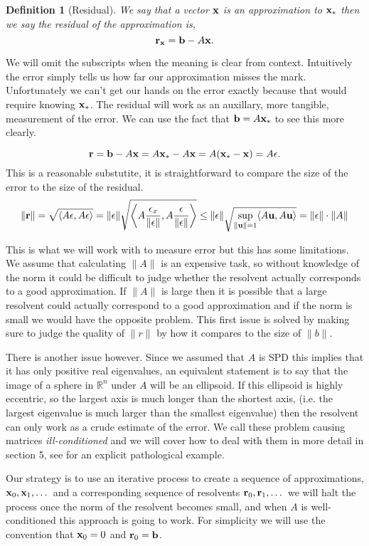 \documentclass{article}
\newcommand{\bx}{{\bf x}}
\newcommand{\bb}{{\bf b}}
\newcommand{\br}{{\bf r}}
\newcommand{\bu}{{\bf u}}
\newcommand{\R}{\mathbb{R}}
\newcommand{\beq}{\begin{equation}}
\newcommand{\eeq}{\end{equation}}
\newtheorem{defn}{Definition}[section]
\theoremstyle{remark}
\begin{document}
\begin{defn}[Residual] We say that a vector $\bx$ is an approximation to $\bx_*$ then we say the residual of the approximation is, 
\beq
\br_\bx = \bb - A\bx .
\eeq
\end{defn}

We will omit the subscripts when the meaning is clear from context. Intuitively the error simply tells us how far our approximation misses the mark. Unfortunately we can't get our hands on the error exactly because that would require knowing $\bx_*$. The residual will work as an auxillary, more tangible, measurement of the error. We can use the fact that $\bb = A\bx_*$ to see this more clearly. 

\beq
\br = \bb - A\bx = A\bx_* - A\bx = A(\bx_* - \bx) = A\epsilon.
\eeq
This is a reasonable substutite, it is straightforward to compare the size of the error to the size of the residual. 
\beq
\|\br \| = \sqrt{\langle A\epsilon , A\epsilon \rangle} = \|\epsilon\|\sqrt{ \left\langle A\frac{\epsilon_x}{\|\epsilon\|} , A\frac{\epsilon}{\|\epsilon\|} \right\rangle} \leq \|\epsilon\| \sqrt{ \sup_{\|\bu\|=1}\langle A\bu, A\bu \rangle} = \|\epsilon\| \cdot \|A\|
\eeq

This is what we will work with to measure error but this has some limitations. We assume that calculating $\|A\|$ is an expensive task, so without knowledge of the norm it could be difficult to judge whether the resolvent actually corresponds to a good approximation. If $\|A\| $ is large then it is possible that a large resolvent could actually correspond to a good approximation and if the norm is small we would have the opposite problem. This first issue is solved by making sure to judge the quality of $\|r\|$ by how it compares to the size of $\|b\|$. 

There is another issue however. Since we assumed that $A$ is SPD this implies that it has only positive real eigenvalues, an equivalent statement is to say that the image of a sphere in $\R^n$ under $A$ will be an ellipsoid. If this ellipsoid is highly eccentric, so the largest axis is much longer than the shortest axis, (i.e. the largest eigenvalue is much larger than the smallest eigenvalue) then the resolvent can only work as a crude estimate of the error. We call these problem causing matrices \textit{ill-conditioned} and we will cover how to deal with them in more detail in section 5, see \cite{hest52}  for an explicit pathological example. 

Our strategy is to use an iterative process to create a sequence of approximations, $\bx_0, \bx_1,\dots$ and a corresponding sequence of resolvents $\br_0, \br_1,\dots$ we will halt the process once the norm of the resolvent becomes small, and when $A$ is well-conditioned this approach is going to work. For simplicity we will use the convention that $\bx_0= 0$ and $\br_0 = \bb$.
\end{document}

